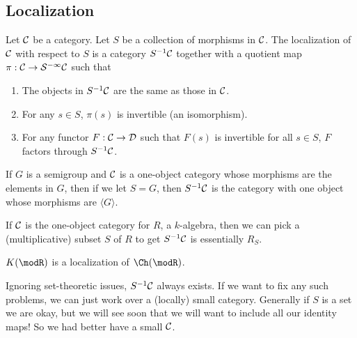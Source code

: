 \documentclass[12pt]{article}
\begin{document}
\subsection{Localization}
\begin{defn}
	Let $\cal C$ be a category. Let $S$ be a collection of morphisms in $\cal C$. The localization of $\cal C$ with respect
	to $S$ is a category $S^{-1}\cal C$ together with a quotient map $\pi:\cal{C}\to S^{-1}\cal C$ such that 
	\begin{enumerate}
		\item The objects in $S^{-1}\cal C$ are the same as those in $\cal C$.
		\item For any $s\in S$, $\pi(s)$ is invertible (an isomorphism).
		\item For any functor $F:\cal{C}\to\cal D$ such that $F(s)$ is invertible for all $s\in S$, $F$ factors through $S^{-1}\cal C$.
	\end{enumerate}
\end{defn}
\begin{ex}
	If $G$ is a semigroup and $\cal C$ is a one-object category whose morphisms are the elements in $G$, then if 
	we let $S=G$, then $S^{-1}\cal C$ is the category with one object whose morphisms are $\langle G\rangle$.
\end{ex}
\begin{ex}
	If $\cal C$ is the one-object category for $R$, a $k$-algebra, then we can pick a (multiplicative) subset $S$ of $R$ 
	to get $S^{-1}\cal C$ is essentially $R_S$.
\end{ex}
\begin{ex}
	$K(\modR)$ is a localization of $\Ch(\modR)$.
\end{ex}
\begin{rmk}
	Ignoring set-theoretic issues, $S^{-1}\cal C$ always exists. If we want to fix any such problems, we 
	can just work over a (locally) small category. Generally if $S$ is a set we are okay, but we will see 
	soon that we will want to include all our identity maps! So we had better have a small $\cal C$.
\end{rmk}
\end{document}
